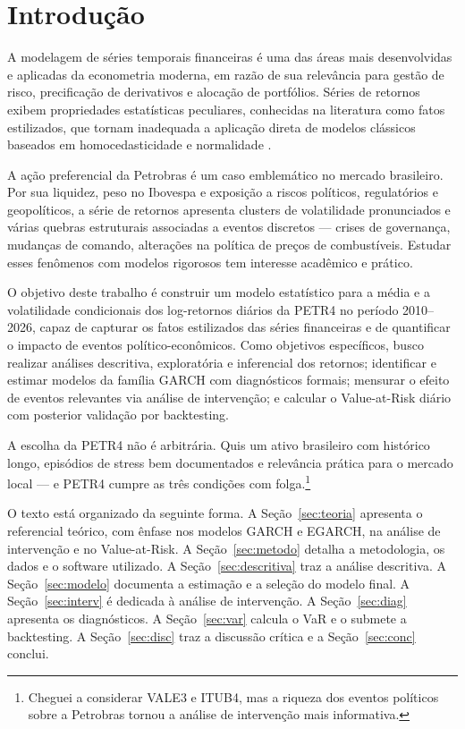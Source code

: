\documentclass[12pt, a4paper]{article}
\begin{document}
\newpage

\section{Introdução}

A modelagem de séries temporais financeiras é uma das áreas mais desenvolvidas e aplicadas da econometria moderna, em razão de sua relevância para gestão de risco, precificação de derivativos e alocação de portfólios. Séries de retornos exibem propriedades estatísticas peculiares, conhecidas na literatura como fatos estilizados, que tornam inadequada a aplicação direta de modelos clássicos baseados em homocedasticidade e normalidade \cite{morettin2017}.

A ação preferencial da Petrobras é um caso emblemático no mercado brasileiro. Por sua liquidez, peso no Ibovespa e exposição a riscos políticos, regulatórios e geopolíticos, a série de retornos apresenta clusters de volatilidade pronunciados e várias quebras estruturais associadas a eventos discretos --- crises de governança, mudanças de comando, alterações na política de preços de combustíveis. Estudar esses fenômenos com modelos rigorosos tem interesse acadêmico e prático.

O objetivo deste trabalho é construir um modelo estatístico para a média e a volatilidade condicionais dos log-retornos diários da PETR4 no período 2010--2026, capaz de capturar os fatos estilizados das séries financeiras e de quantificar o impacto de eventos político-econômicos. Como objetivos específicos, busco realizar análises descritiva, exploratória e inferencial dos retornos; identificar e estimar modelos da família GARCH com diagnósticos formais; mensurar o efeito de eventos relevantes via análise de intervenção; e calcular o Value-at-Risk diário com posterior validação por backtesting.

A escolha da PETR4 não é arbitrária. Quis um ativo brasileiro com histórico longo, episódios de stress bem documentados e relevância prática para o mercado local --- e PETR4 cumpre as três condições com folga.\footnote{Cheguei a considerar VALE3 e ITUB4, mas a riqueza dos eventos políticos sobre a Petrobras tornou a análise de intervenção mais informativa.}

O texto está organizado da seguinte forma. A Seção~\ref{sec:teoria} apresenta o referencial teórico, com ênfase nos modelos GARCH e EGARCH, na análise de intervenção e no Value-at-Risk. A Seção~\ref{sec:metodo} detalha a metodologia, os dados e o software utilizado. A Seção~\ref{sec:descritiva} traz a análise descritiva. A Seção~\ref{sec:modelo} documenta a estimação e a seleção do modelo final. A Seção~\ref{sec:interv} é dedicada à análise de intervenção. A Seção~\ref{sec:diag} apresenta os diagnósticos. A Seção~\ref{sec:var} calcula o VaR e o submete a backtesting. A Seção~\ref{sec:disc} traz a discussão crítica e a Seção~\ref{sec:conc} conclui.
\end{document}
